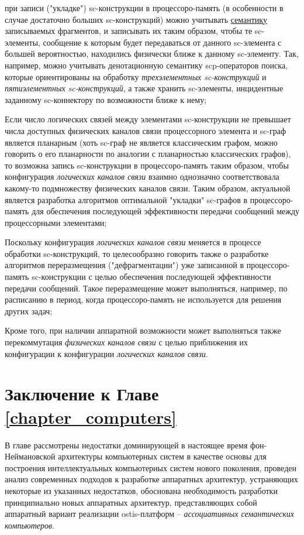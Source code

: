 \begin{textitemize}
	\item при записи ("укладке"{}) sc-конструкции в процессоро-память (в особенности в случае достаточно больших sc-конструкций) можно учитывать \underline{семантику} записываемых фрагментов, и записывать их таким образом, чтобы те sc-элементы, сообщение к которым будет передаваться от данного sc-элемента с большей вероятностью, находились физически ближе к данному sc-элементу. Так, например, можно учитывать денотационную семантику scp-операторов поиска, которые ориентированы на обработку \textit{трехэлементных sc-конструкций} и \textit{пятиэлементных sc-конструкций}, а также хранить sc-элементы, инцидентные заданному sc-коннектору по возможности ближе к нему;
	\item Если число логических связей между элементами sc-конструкции не превышает числа доступных физических каналов связи процессорного элемента и sc-граф является планарным (хоть sc-граф не является классическим графом, можно говорить о его планарности по аналогии с планарностью классических графов), то возможна запись sc-конструкции в процессоро-память таким образом, чтобы конфигурация \textit{логических каналов связи}  взаимно однозначно соответствовала какому-то подмножеству физических каналов связи. Таким образом, актуальной является разработка алгоритмов оптимальной "укладки"{} sc-графов в процессоро-память для обеспечения последующей эффективности передачи сообщений между процессорными элементами;
	\item Поскольку конфигурация \textit{логических каналов связи} меняется в процессе обработки sc-конструкций, то целесообразно говорить также о разработке алгоритмов переразмещения ("дефрагментации") уже записанной в процессоро-память sc-конструкции с целью обеспечения последующей эффективности передачи сообщений. Такое переразмещение может выполняться, например, по расписанию в период, когда процессоро-память не используется для решения других задач;
	\item Кроме того, при наличии аппаратной возможности может выполняться также перекоммутация \textit{физических каналов связи} с целью приближения их конфигурации к конфигурации \textit{логических каналов связи}.
\end{textitemize}

\section*{Заключение к Главе \ref{chapter_computers}}
В главе рассмотрены недостатки доминирующей в настоящее время фон-Неймановской архитектуры компьютерных систем в качестве основы для построения интеллектуальных компьютерных систем нового поколения, проведен анализ современных подходов к разработке аппаратных архитектур, устраняющих некоторые из указанных недостатков, обоснована необходимость разработки принципиально новых аппаратных архитектур, представляющих собой аппаратный вариант реализации ostis-платформ -- \textit{ассоциативных семантических компьютеров}.

